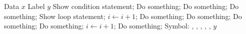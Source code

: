 \begin{algorithmic}[1]
    \REQUIRE Data $x$
    \ENSURE Label $y$
    \STATE Show condition statement;
        \STATE Do something;
        \STATE Do something;
    \ELSE
        \STATE Do something;
    \ENDIF
    \STATE Show loop statement;
        \STATE $i \leftarrow i + 1$;
        \STATE Do something;
    \ENDFOR
        \STATE Do something;
    \ENDFOR
        \STATE Do something;
    \ENDWHILE
    \REPEAT
        \STATE Do something;
        \STATE $i \leftarrow i + 1$;
    \LOOP
        \STATE Do something;
    \ENDLOOP
    \STATE Symbol: \NOT, \AND, \OR, \XOR, \FALSE, \TRUE
    \RETURN $y$
\end{algorithmic}
